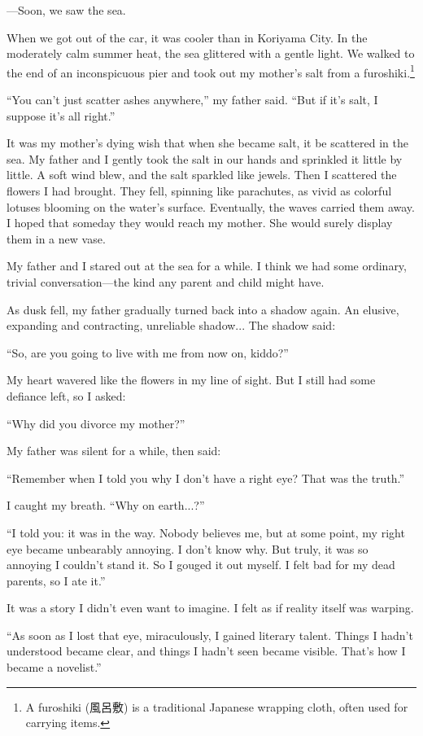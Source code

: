 \documentclass[
    a4paper,
    12pt,
    twoside,
    openany,
    UTF8,
    fontset=windows
]{ctexbook}
\begin{document}
---Soon, we saw the sea.

When we got out of the car, it was cooler than in Koriyama City. In the moderately calm summer heat, the sea glittered with a gentle light. We walked to the end of an inconspicuous pier and took out my mother's salt from a furoshiki.\footnote{A furoshiki (風呂敷) is a traditional Japanese wrapping cloth, often used for carrying items.}

``You can't just scatter ashes anywhere,'' my father said. ``But if it's salt, I suppose it's all right.''

It was my mother's dying wish that when she became salt, it be scattered in the sea. My father and I gently took the salt in our hands and sprinkled it little by little. A soft wind blew, and the salt sparkled like jewels. Then I scattered the flowers I had brought. They fell, spinning like parachutes, as vivid as colorful lotuses blooming on the water's surface. Eventually, the waves carried them away. I hoped that someday they would reach my mother. She would surely display them in a new vase.

My father and I stared out at the sea for a while. I think we had some ordinary, trivial conversation---the kind any parent and child might have.

As dusk fell, my father gradually turned back into a shadow again. An elusive, expanding and contracting, unreliable shadow... The shadow said:

``So, are you going to live with me from now on, kiddo?''

My heart wavered like the flowers in my line of sight. But I still had some defiance left, so I asked:

``Why did you divorce my mother?''

My father was silent for a while, then said:

``Remember when I told you why I don't have a right eye? That was the truth.''

I caught my breath. ``Why on earth...?''

``I told you: it was in the way. Nobody believes me, but at some point, my right eye became unbearably annoying. I don't know why. But truly, it was so annoying I couldn't stand it. So I gouged it out myself. I felt bad for my dead parents, so I ate it.''

It was a story I didn't even want to imagine. I felt as if reality itself was warping.

``As soon as I lost that eye, miraculously, I gained literary talent. Things I hadn't understood became clear, and things I hadn't seen became visible. That's how I became a novelist.''
\end{document}
